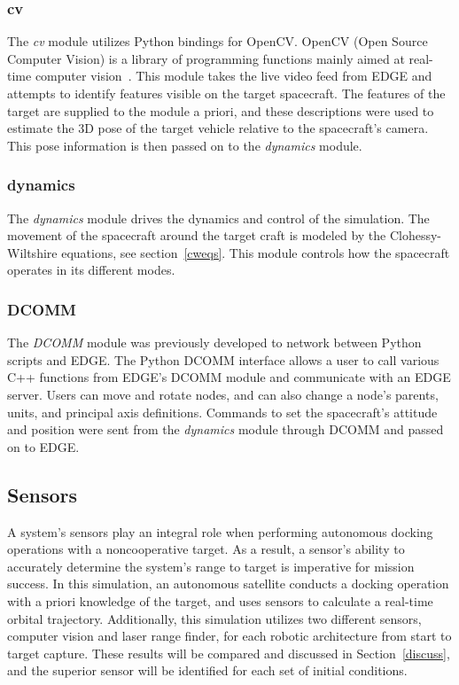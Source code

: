 \documentclass[journal, 10pt]{IEEEtran}
\begin{document}
\subsubsection{cv}
The \textit{cv} module utilizes Python bindings for OpenCV. OpenCV (Open Source Computer Vision) is a library of programming functions mainly aimed at real-time computer vision~\cite{opencv}. This module takes the live video feed from EDGE and attempts to identify features visible on the target spacecraft. The features of the target are supplied to the module a priori, and these descriptions were used to estimate the 3D pose of the target vehicle relative to the spacecraft's camera. This pose information is then passed on to the \textit{dynamics} module.

\subsubsection{dynamics}
The \textit{dynamics} module drives the dynamics and control of the simulation. The movement of the spacecraft around the target craft is modeled by the Clohessy-Wiltshire equations, see section~\ref{cweqs}. This module controls how the spacecraft operates in its different modes.

\subsubsection{DCOMM}
The \textit{DCOMM} module was previously developed to network between Python scripts and EDGE. The Python DCOMM interface allows a user to call various C++ functions from EDGE's DCOMM module and communicate with an EDGE server. Users can move and rotate nodes, and can also change a node's parents, units, and principal axis definitions. Commands to set the spacecraft's attitude and position were sent from the \textit{dynamics} module through DCOMM and passed on to EDGE.

\subsection{Sensors}
A system's sensors play an integral role when performing autonomous docking operations with a noncooperative target. As a result, a sensor's ability to accurately determine the system's range to target is imperative for mission success. In this simulation, an autonomous satellite conducts a docking operation with a priori knowledge of the target, and uses sensors to calculate a real-time orbital trajectory. Additionally, this simulation utilizes two different sensors, computer vision and laser range finder, for each robotic architecture from start to target capture. These results will be compared and discussed in Section~\ref{discuss}, and the superior sensor will be identified for each set of initial conditions.
\end{document}
